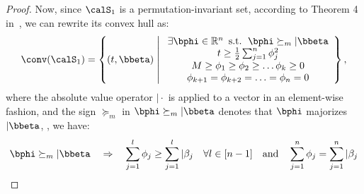 \begin{proof}
Now, since $\calS_1$ is a permutation-invariant set, according to Theorem 4 in~\cite{kim2022convexification}, we can rewrite its convex hull as:
\begin{align}
    \label{appendix_def:convex_cardinality_and_coefficient_constraint_set_majorization_formulation}
    \conv(\calS_1) = \left\{ (t, \bbeta) \;\middle|\;
    \begin{array}{cc}
        \exists \bphi \in \mathbb{R}^n \text{\, s.t. \,} \bphi \succeq_m \vert{\bbeta} \\
        t \geq \frac{1}{2} \sum_{j=1}^{n} \phi_j^2 \\
        M \geq \phi_1 \geq \phi_2 \geq \ldots \phi_k \geq 0 \\
        \phi_{k+1} = \phi_{k+2} = \ldots = \phi_n = 0 
    \end{array}
    \right\},
\end{align}
where the absolute value operator $\vert{\cdot}$ is applied to a vector in an element-wise fashion, and the sign $\succeq_m$ in $\bphi \succeq_m \vert{\bbeta}$ denotes that $\bphi$ majorizes $\vert{\bbeta}$, , we have: 
\begin{align}
    \label{appendix_def:vector_majorization}
    \bphi \succeq_m \vert{\bbeta} \quad \Rightarrow \quad \sum_{j=1}^l \phi_j \geq \sum_{j=1}^l \vert{\beta_j} \quad \forall l \in [n-1] \quad \text{and} \quad \sum_{j=1}^n \phi_j = \sum_{j=1}^n \vert{\beta_j}
\end{align}


\end{proof}
